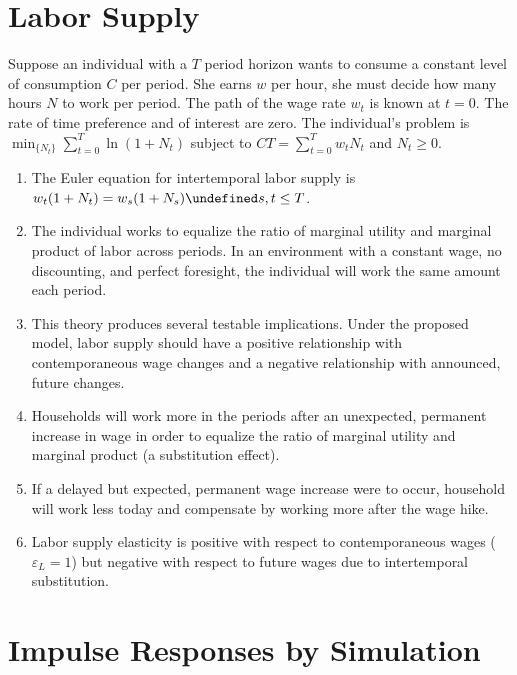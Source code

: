 \documentclass[11pt]{article}
\let\oldforall\forall
\let\forall\undefined
\DeclareMathOperator{\forall}{\oldforall}
\begin{document}
\section{Labor Supply}

    Suppose an individual with a $T$ period horizon wants to consume a constant level of consumption $C$ per period. She earns $w$ per hour, she must decide how many hours $N$ to work per period. The path of the wage rate $w_t$ is known at $t=0$. The rate of time preference and of interest are zero. The individual's problem is $\min_{\{N_t\}} \sum_{t=0}^T \ln(1+N_t)$ subject to $CT = \sum_{t=0}^T w_t N_t$ and $N_t \geq 0$.

    \begin{enumerate}

        \item The Euler equation for intertemporal labor supply is $w_t (1 + N_t) = w_s (1 + N_s) \forall s, t \leq T$.

        \item The individual works to equalize the ratio of marginal utility and marginal product of labor across periods. In an environment with a constant wage, no discounting, and perfect foresight, the individual will work the same amount each period.

        \item This theory produces several testable implications. Under the proposed model, labor supply should have a positive relationship with contemporaneous wage changes and a negative relationship with announced, future changes.

        \item Households will work more in the periods after an unexpected, permanent increase in wage in order to equalize the ratio of marginal utility and marginal product (a substitution effect).

        \item If a delayed but expected, permanent wage increase were to occur, household will work less today and compensate by working more after the wage hike.

        \item Labor supply elasticity is positive with respect to contemporaneous wages ($\varepsilon_L = 1$) but negative with respect to future wages due to intertemporal substitution.

    \end{enumerate}

\section{Impulse Responses by Simulation}
\end{document}
